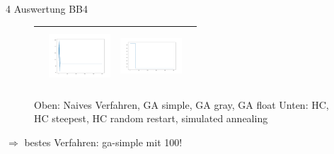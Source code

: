\documentclass{ocbeameruni}
\begin{document}
\begin{frame}{4 Auswertung BB4}
\begin{center}
\begin{figure}
\begin{tabular}{|c|c|c|c|}
    & \includegraphics[width=23mm, height=20mm]{plots/bb4_hc_rs.png}
    & \includegraphics[width=23mm, height=20mm]{plots/bb4_sa.png} \\ \hline
    \end{tabular}
    \caption{Oben: Naives Verfahren, GA simple, GA gray, GA float \hspace{\textwidth}Unten: HC, HC steepest, HC random restart, simulated annealing}
    \end{figure}
    $\Rightarrow$ bestes Verfahren: ga-simple mit 100!
    \end{center}
\end{frame}
\end{document}
